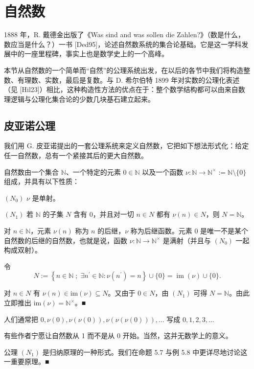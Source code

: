 \section{自然数}

1888 年，R. 戴德金出版了《Was sind and was sollen die Zahlen?》（数是什么，数应当是什么？）一书 [Ded95]，论述自然数系统的集合论基础。它是这一学科发展中的一座里程碑，事实上也是数学史上的一个高峰。

本节从自然数的一个简单而“自然”的公理系统出发，在以后的各节中我们将构造整数、有理数、实数，最后是复数。与 D. 希尔伯特 1899 年对实数的公理化表述（见 [Hil23]）相比，这种构造性方法的优点在于：整个数学结构都可以由来自数理逻辑与公理化集合论的少数几块基石建立起来。

\subsection*{皮亚诺公理}

我们用 G. 皮亚诺提出的一套公理系统来定义自然数，它把如下想法形式化：给定任一自然数，总有一个紧接其后的更大自然数。

自然数由一个集合 $ \mathbb{N} $、一个特定的元素 $ 0 \in \mathbb{N} $ 以及一个函数 $ \nu: \mathbb{N} \to \mathbb{N}^\times := \mathbb{N} \setminus \{0\} $ 组成，并具有以下性质：

$ (N_{0}) $  $ \nu $ 是单射。

$ (N_1) $ 若 $ \mathbb{N} $ 的子集 $ N $ 含有 0，并且对一切 $ n \in N $ 都有 $ \nu(n) \in N $，则 $ N = \mathbb{N} $。

\begin{remark}

\begin{items}
\item

对 $ n \in \mathbb{N} $，元素 $ \nu(n) $ 称为 $ n $ 的后继，$ \nu $ 称为后继函数。元素 0 是唯一不是某个自然数的后继的自然数，也就是说，函数 $ \nu: \mathbb{N} \to \mathbb{N}^\times $ 是满射（并且与 $ (N_0) $ 一起构成双射）。

\proofhead
令
\[
N:=\left\{n\in\mathbb{N}\;;\;\exists n^{\prime}\in\mathbb{N}\colon\nu(n^{\prime})=n\right\}\cup\{0\}=\operatorname{i m}(\nu)\cup\{0\}.
\]

对 $ n \in N $ 有 $ \nu(n) \in \mathrm{im}(\nu) \subseteq N $。又由于 $ 0 \in N $，由 $ (N_1) $ 可得 $ N = \mathbb{N} $。由此立即推出 $ \mathrm{im}(\nu) = \mathbb{N}^\times $。■

\item

人们通常把 $0,\nu(0),\nu(\nu(0)),\nu(\nu(\nu(0))),\ldots$ 写成 $0,1,2,3,\ldots$

\item

有些作者宁愿让自然数从 1 而不是从 0 开始。当然，这并无数学上的意义。

\item

公理 $ (N_{1}) $ 是归纳原理的一种形式。我们在命题 5.7 与例 5.8 中更详尽地讨论这一重要原理。■

\end{items}

\end{remark}

